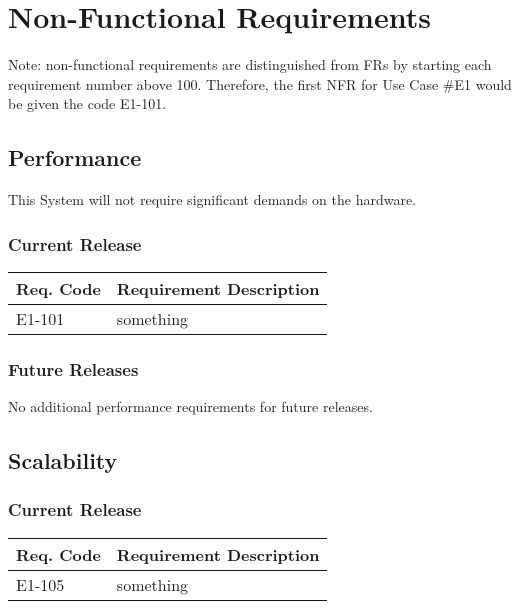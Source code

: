\documentclass[12pt]{article}
\begin{document}
\section{Non-Functional Requirements}
Note: non-functional requirements are distinguished from FRs by starting each requirement number above 100. Therefore, the first 
NFR for Use Case \#E1 would be given the code E1-101.

\subsection{Performance}
This System will not require significant demands on the hardware.

\subsubsection{Current Release}

\begin{table}[!h]
	\begin{tabular}{| l | l |}
		\hline
		\textbf{Req. Code} & \textbf{Requirement Description}\\
		\hline
		E1-101	& something\\
		\hline
	\end{tabular}
	\label{tab:PerformanceRequirements}
\end{table}

\subsubsection{Future Releases}
No additional performance requirements for future releases.


\subsection{Scalability}

\subsubsection{Current Release}

\begin{table}[!h]
	\begin{tabular}{| l | l |}
		\hline
		\textbf{Req. Code} & \textbf{Requirement Description}\\
		\hline
		E1-105	& something\\
		\hline
	\end{tabular}
	\label{tab:ScalabilityRequirements}
\end{table}
\end{document}

